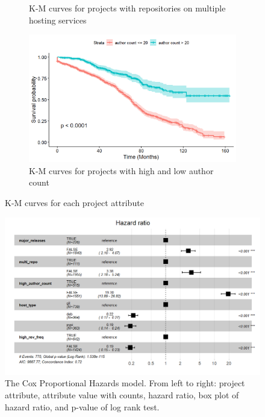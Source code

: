 \documentclass[acmconf]{acmart}
\begin{document}
\begin{figure}[!ht]
\begin{subfigure}[b]{0.45\columnwidth}
        \caption{\small K-M curves for projects with repositories on multiple hosting services} 
        \label{fig:multi_repo}
    \end{subfigure}
    \hfill
    \begin{subfigure}[b]{0.45\columnwidth} 
        \centering 
        \includegraphics[width=\textwidth]{img/KM-author_count.jpg}
        \caption{\small K-M curves for projects with high and low author count} 
        \label{fig:author_count}
    \end{subfigure}
    \caption{\small K-M curves for each project attribute} 
    \label{fig:KM curves}
\end{figure}

\begin{figure}[!ht]
\centering
\includegraphics[scale=0.5]{img/CoxHR-table.jpg}
\caption{The Cox Proportional Hazards model. From left to right: project attribute, attribute value with counts, hazard ratio, box plot of hazard ratio, and p-value of log rank test.}
\label{fig:Cox}
\end{figure}
\end{document}
